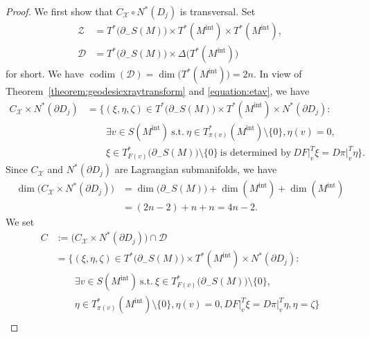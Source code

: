 \documentclass[a4paper,11pt,reqno]{amsart}
\numberwithin{equation}{section}
\theoremstyle{definition}
\theoremstyle{remark}
\begin{document}
\begin{proof}
We first show that $C_\mathcal{X}{\circ}N^\ast(D_j)$  is transversal. 
Set 
%
%
\begin{align*}
  \mathcal{Z}
& =
  T^\ast\bigl(\partial_-S(M)\bigr)
  \times
  T^\ast(M^\text{int})
  \times
  T^\ast(M^\text{int}),
\\
  \mathcal{D}
& =
  T^\ast\bigl(\partial_-S(M)\bigr)
  \times
  \Delta\bigl(T^\ast(M^\text{int})\bigr)
\end{align*}
%
%
for short. We have 
$\operatorname{codim}(\mathcal{D})=\operatorname{dim}\bigl(T^\ast(M^\text{int})\bigr)=2n$. 
In view of Theorem~\ref{theorem:geodesicxraytransform} and \eqref{equation:etav}, we have  
%
%
\begin{align*}
  C_\mathcal{X}{\times}N^\ast({\partial}D_j)
& =
  \bigl\{
  (\xi,\eta,\zeta) 
  \in 
  T^\ast\bigl(\partial_-S(M)\bigr){\times}T^\ast(M^\text{int}){\times}N^\ast(\partial{D_j}): 
\\
& \qquad
  \exists v \in S(M^\text{int})\ \text{s.t.}\  
  \eta \in T^\ast_{\pi(v)}(M^\text{int})\setminus\{0\}, 
  \eta(v)=0, 
\\
& \qquad 
  \xi \in T^\ast_{F(v)}\bigl(\partial_-S(M)\bigr)\setminus\{0\} 
  \ \text{is determined by}\ 
  DF\vert^T_v\xi=D\pi\vert^T_v\eta
  \bigr\}. 
\end{align*}
%
%
Since $C_\mathcal{X}$ and $N^\ast(\partial{D_j})$ are Lagrangian submanifolds, we have 
%
%
\begin{align*}
  \operatorname{dim}\bigl(C_\mathcal{X}{\times}N^\ast({\partial}D_j)\bigr)
& = 
  \operatorname{dim}\bigl(\partial_-S(M)\bigr)
  +
  \operatorname{dim}(M^\text{int})
  +
  \operatorname{dim}(M^\text{int})
\\
& =
  (2n-2)+n+n
  =4n-2.
\end{align*} 
%
%
We set 
%
%
\begin{align}
  C
& :=
  \bigl(C_\mathcal{X}{\times}N^\ast({\partial}D_j)\bigr)\cap\mathcal{D}
\nonumber
\\
& =
  \bigl\{
  (\xi,\eta,\zeta) 
  \in 
  T^\ast\bigl(\partial_-S(M)\bigr){\times}T^\ast(M^\text{int}){\times}N^\ast(\partial{D_j}): 
\nonumber
\\
& \qquad 
  \exists v \in S(M^\text{int})\ \text{s.t.}\  
  \xi \in T^\ast_{F(v)}\bigl(\partial_-S(M)\bigr)\setminus\{0\}, 
\nonumber
\\
& \qquad
  \eta \in T^\ast_{\pi(v)}(M^\text{int})\setminus\{0\}, 
  \eta(v)=0, 
  DF\vert^T_v\xi=D\pi\vert^T_v\eta,\eta=\zeta\}
\nonumber
\\

\end{align}
\end{proof}
\end{document}
